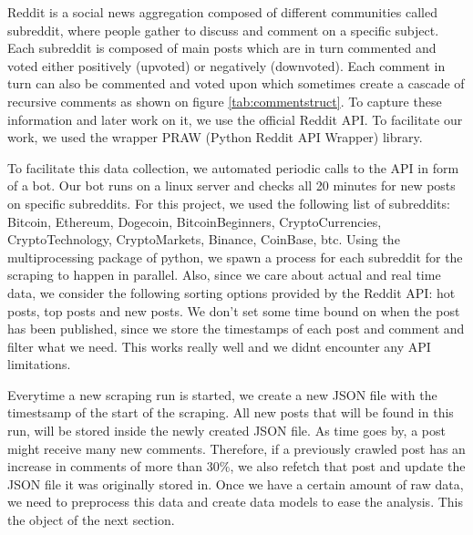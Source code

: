 Reddit is a social news aggregation composed of different communities called subreddit, where people gather to discuss and comment on a specific subject. Each subreddit is composed of main posts which are in turn commented and voted either positively (upvoted) or negatively (downvoted). Each comment in turn can also be commented and voted upon which sometimes create a cascade of recursive comments as shown on figure \ref{tab:commentstruct}. To capture these information and later work on it, we use the official Reddit API. To facilitate our work, we used the wrapper PRAW (Python Reddit API Wrapper) library.

To facilitate this data collection, we automated periodic calls to the API in form of a bot. Our bot runs on a linux server and checks all 20 minutes for new posts on specific subreddits. For this project, we used the following list of subreddits: Bitcoin, Ethereum, Dogecoin, BitcoinBeginners, CryptoCurrencies, CryptoTechnology, CryptoMarkets, Binance, CoinBase, btc.
Using the multiprocessing package of python, we spawn a process for each subreddit for the scraping to happen in parallel.
Also, since we care about actual and real time data, we consider the following sorting options provided by the Reddit API: hot posts, top posts and new posts. We don't set some time bound on when the post has been published, since we store the timestamps of each post and comment and filter what we need. This works really well and we didnt encounter any API limitations.

Everytime a new scraping run is started, we create a new JSON file with the timestsamp of the start of the scraping. All new posts that will be found in this run, will be stored inside the newly created JSON file. As time goes by, a post might receive many new comments. Therefore, if a previously crawled post has an increase in comments of more than 30\%, we also refetch that post and update the JSON file it was originally stored in. Once we have a certain amount of raw data, we need to preprocess this data and create data models to ease the analysis. This the object of the next section.
